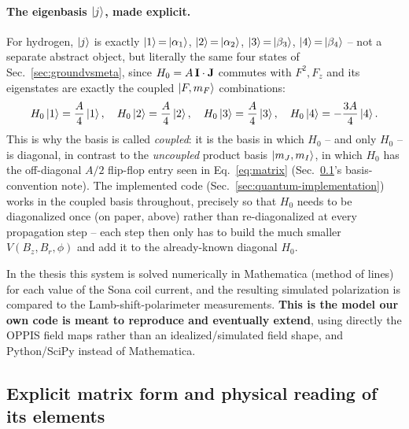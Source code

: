 \documentclass[11pt,a4paper]{article}
\begin{document}
\paragraph{The eigenbasis $\ket{j}$, made explicit.} For hydrogen, $\ket{j}$
is exactly $\ket{1}{=}\ket{\alpha_1}$, $\ket{2}{=}\ket{\alpha_2}$,
$\ket{3}{=}\ket{\beta_3}$, $\ket{4}{=}\ket{\beta_4}$ -- not a separate
abstract object, but literally the same four states of
Sec.~\ref{sec:groundvsmeta}, since $H_0=A\,\vb{I}\cdot\vb{J}$ commutes with
$F^2,F_z$ and its eigenstates are exactly the coupled $\ket{F,m_F}$
combinations:
\begin{equation}
    H_0\ket{1} = \frac{A}{4}\ket{1}, \quad
    H_0\ket{2} = \frac{A}{4}\ket{2}, \quad
    H_0\ket{3} = \frac{A}{4}\ket{3}, \quad
    H_0\ket{4} = -\frac{3A}{4}\ket{4}.
\end{equation}
This is why the basis is called \emph{coupled}: it is the basis in which
$H_0$ -- and only $H_0$ -- is diagonal, in contrast to the
\emph{uncoupled} product basis $\ket{m_J,m_I}$, in which $H_0$ has the
off-diagonal $A/2$ flip-flop entry seen in Eq.~\eqref{eq:matrix}
(Sec.~\ref{sec:matrix}'s basis-convention note). The implemented code
(Sec.~\ref{sec:quantum-implementation}) works in the coupled basis
throughout, precisely so that $H_0$ needs to be diagonalized once
(on paper, above) rather than re-diagonalized at every propagation step --
each step then only has to build the much smaller $V(B_z,B_r,\phi)$ and add
it to the already-known diagonal $H_0$.

In the thesis this system is solved numerically in Mathematica (method of lines) for each
value of the Sona coil current, and the resulting simulated polarization is
compared to the Lamb-shift-polarimeter measurements. \textbf{This is the
model our own code is meant to reproduce and eventually extend}, using
directly the OPPIS field maps rather than an idealized/simulated field
shape, and Python/SciPy instead of Mathematica.

\subsection{Explicit matrix form and physical reading of its elements}
\label{sec:matrix}
\end{document}

